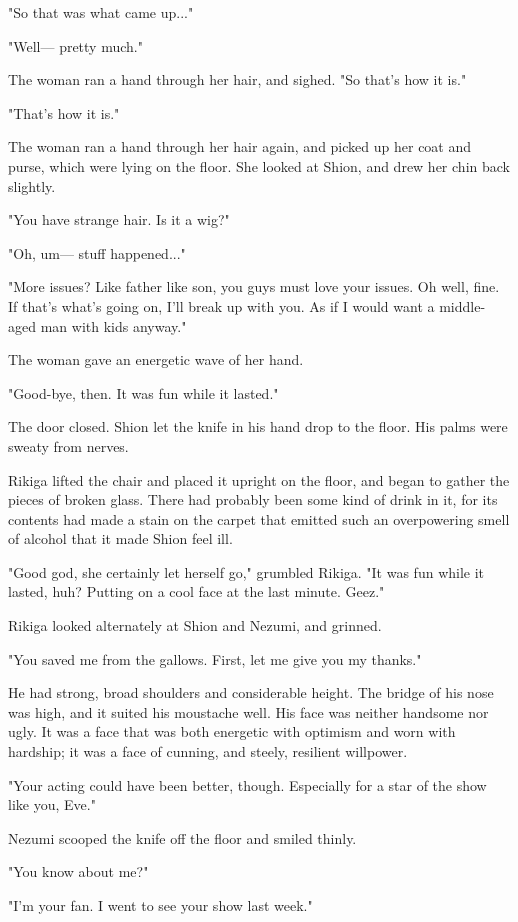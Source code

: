 "So that was what came up..."

"Well--- pretty much."

The woman ran a hand through her hair, and sighed. "So that's how it
is."

"That's how it is."

The woman ran a hand through her hair again, and picked up her coat and
purse, which were lying on the floor. She looked at Shion, and drew her
chin back slightly.

"You have strange hair. Is it a wig?"

"Oh, um--- stuff happened..."

"More issues? Like father like son, you guys must love your issues. Oh
well, fine. If that's what's going on, I'll break up with you. As if I
would want a middle-aged man with kids anyway."

The woman gave an energetic wave of her hand.

"Good-bye, then. It was fun while it lasted."

The door closed. Shion let the knife in his hand drop to the floor. His
palms were sweaty from nerves.

Rikiga lifted the chair and placed it upright on the floor, and began to
gather the pieces of broken glass. There had probably been some kind of
drink in it, for its contents had made a stain on the carpet that
emitted such an overpowering smell of alcohol that it made Shion feel
ill.

"Good god, she certainly let herself go," grumbled Rikiga. "It was fun
while it lasted, huh? Putting on a cool face at the last minute. Geez."

Rikiga looked alternately at Shion and Nezumi, and grinned.

"You saved me from the gallows. First, let me give you my thanks."

He had strong, broad shoulders and considerable height. The bridge of
his nose was high, and it suited his moustache well. His face was
neither handsome nor ugly. It was a face that was both energetic with
optimism and worn with hardship; it was a face of cunning, and steely,
resilient willpower.

"Your acting could have been better, though. Especially for a star of
the show like you, Eve."

Nezumi scooped the knife off the floor and smiled thinly.

"You know about me?"

"I'm your fan. I went to see your show last week."

